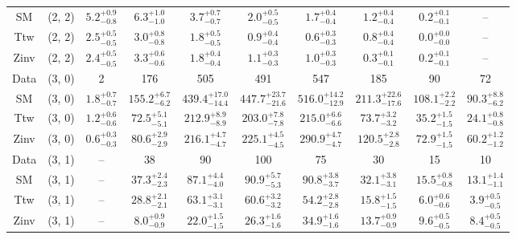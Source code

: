 \begin{table}[h!]
{\begin{tabular}{cccccccccc}
	SM & (2, 2) & $5.2^{+ 0.9 }_{- 0.8 }$ & $6.3^{+ 1.0 }_{- 1.0 }$ & $3.7^{+ 0.7 }_{- 0.7 }$ & $2.0^{+ 0.5 }_{- 0.5 }$ & $1.7^{+ 0.4 }_{- 0.4 }$ & $1.2^{+ 0.4 }_{- 0.4 }$ & $0.2^{+ 0.1 }_{- 0.1 }$ & -- \\[0.5ex] 
	Ttw & (2, 2) & $2.5^{+ 0.5 }_{- 0.5 }$ & $3.0^{+ 0.8 }_{- 0.8 }$ & $1.8^{+ 0.5 }_{- 0.5 }$ & $0.9^{+ 0.4 }_{- 0.4 }$ & $0.6^{+ 0.3 }_{- 0.3 }$ & $0.8^{+ 0.4 }_{- 0.4 }$ & $0.0^{+ 0.0 }_{- 0.0 }$ & -- \\[0.5ex] 
	Zinv & (2, 2) & $2.4^{+ 0.5 }_{- 0.5 }$ & $3.3^{+ 0.6 }_{- 0.6 }$ & $1.8^{+ 0.4 }_{- 0.4 }$ & $1.1^{+ 0.3 }_{- 0.3 }$ & $1.0^{+ 0.3 }_{- 0.3 }$ & $0.3^{+ 0.1 }_{- 0.1 }$ & $0.2^{+ 0.1 }_{- 0.1 }$ & -- \\[0.5ex] 
	Data & (3, 0) & 2 & 176 & 505 & 491 & 547 & 185 & 90 & 72 \\[0.5ex] 
	SM & (3, 0) & $1.8^{+ 0.7 }_{- 0.7 }$ & $155.2^{+ 6.7 }_{- 6.2 }$ & $439.4^{+ 17.0 }_{- 14.4 }$ & $447.7^{+ 23.7 }_{- 21.6 }$ & $516.0^{+ 14.2 }_{- 12.9 }$ & $211.3^{+ 22.6 }_{- 17.6 }$ & $108.1^{+ 2.2 }_{- 2.2 }$ & $90.3^{+ 8.8 }_{- 6.2 }$ \\[0.5ex] 
	Ttw & (3, 0) & $1.2^{+ 0.6 }_{- 0.6 }$ & $72.5^{+ 5.1 }_{- 5.1 }$ & $212.9^{+ 8.9 }_{- 8.9 }$ & $203.0^{+ 7.8 }_{- 7.8 }$ & $215.0^{+ 6.6 }_{- 6.6 }$ & $73.7^{+ 3.2 }_{- 3.2 }$ & $35.2^{+ 1.5 }_{- 1.5 }$ & $24.1^{+ 0.8 }_{- 0.8 }$ \\[0.5ex] 
	Zinv & (3, 0) & $0.6^{+ 0.3 }_{- 0.3 }$ & $80.6^{+ 2.9 }_{- 2.9 }$ & $216.1^{+ 4.7 }_{- 4.7 }$ & $225.1^{+ 4.5 }_{- 4.5 }$ & $290.9^{+ 4.7 }_{- 4.7 }$ & $120.5^{+ 2.8 }_{- 2.8 }$ & $72.9^{+ 1.5 }_{- 1.5 }$ & $60.2^{+ 1.2 }_{- 1.2 }$ \\[0.5ex] 
	Data & (3, 1) & -- & 38 & 90 & 100 & 75 & 30 & 15 & 10 \\[0.5ex] 
	SM & (3, 1) & -- & $37.3^{+ 2.4 }_{- 2.3 }$ & $87.1^{+ 4.4 }_{- 4.0 }$ & $90.9^{+ 5.7 }_{- 5.3 }$ & $90.8^{+ 3.8 }_{- 3.7 }$ & $32.1^{+ 3.8 }_{- 3.1 }$ & $15.5^{+ 0.8 }_{- 0.8 }$ & $13.1^{+ 1.4 }_{- 1.1 }$ \\[0.5ex] 
	Ttw & (3, 1) & -- & $28.8^{+ 2.1 }_{- 2.1 }$ & $63.1^{+ 3.1 }_{- 3.1 }$ & $60.6^{+ 3.2 }_{- 3.2 }$ & $54.2^{+ 2.8 }_{- 2.8 }$ & $15.8^{+ 1.5 }_{- 1.5 }$ & $6.0^{+ 0.6 }_{- 0.6 }$ & $3.9^{+ 0.5 }_{- 0.5 }$ \\[0.5ex] 
	Zinv & (3, 1) & -- & $8.0^{+ 0.9 }_{- 0.9 }$ & $22.0^{+ 1.5 }_{- 1.5 }$ & $26.3^{+ 1.6 }_{- 1.6 }$ & $34.9^{+ 1.6 }_{- 1.6 }$ & $13.7^{+ 0.9 }_{- 0.9 }$ & $9.6^{+ 0.5 }_{- 0.5 }$ & $8.4^{+ 0.5 }_{- 0.5 }$ \\[0.5ex] 

\end{tabular}}
\end{table}

